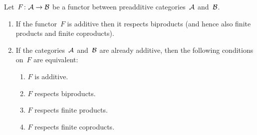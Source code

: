 \begin{theorem}
  \label{characterizations of additive functors}
  Let~$F \colon \mathcal{A} \to \mathcal{B}$ be a functor between preadditive categories~$\mathcal{A}$ and~$\mathcal{B}$.
  \begin{enumerate}
    \item
      \label{additive preserves biproducts}
      If the functor~$F$ is additive then it respects biproducts (and hence also finite products and finite coproducts).
    \item
      If the categories~$\mathcal{A}$ and~$\mathcal{B}$ are already additive, then the following conditions on~$F$ are equivalent:
      \begin{enumerate}
        \item
          \label{is additive}
          $F$ is additive.
        \item
          \label{respects biproducts}
          $F$ respects biproducts.
        \item
          \label{respects finite products}
          $F$ respects finite products.
        \item
          \label{respects finite coproducts}
          $F$ respects finite coproducts.
      \end{enumerate}
  \end{enumerate}
\end{theorem}


